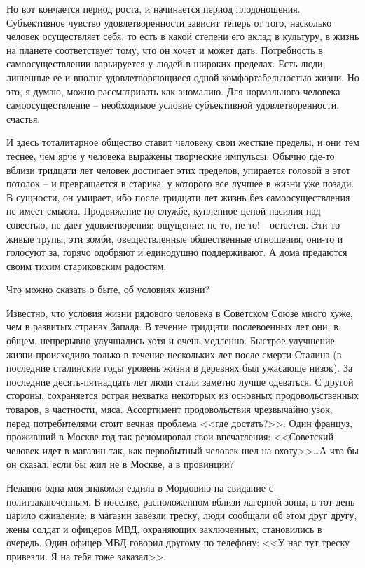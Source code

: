 \documentclass{book}
\begin{document}
Но вот кончается период роста, и начинается период плодо­ношения. Субъективное чувство удовлетворенности зависит теперь от того, 
насколько человек осуществляет себя,  то есть в какой степени его вклад в культуру, в жизнь на планете соответствует тому, что 
он хочет и может дать. Потребность в самоосуществлении варьируется у людей в широких пределах. Есть люди, лишенные ее и вполне 
удовлетворяющиеся одной комфортабельностью жизни. Но это, я думаю, можно рассматривать как аномалию. Для нормального человека 
самоосуществление -- необходимое условие субъективной удовлетворенности, счастья.

И здесь тоталитарное общество ставит человеку свои жесткие пределы, и они тем теснее, чем ярче у человека выражены творческие 
импульсы. Обычно где-то вблизи тридцати лет человек достигает этих пределов, упирается головой в этот потолок -- и превращается 
в старика, у которого все лучшее в жизни уже позади. В сущности, он умирает, ибо после тридцати лет жизнь без самоосуществления 
не имеет смысла. Продвиже­ние по службе, купленное ценой насилия над совестью, не дает удовлетворения; ощущение: не то, не то! - 
остается. Эти-то живые трупы, эти зомби, овеществленные общественные отно­шения, они-то и голосуют за, горячо одобряют и 
единодушно поддерживают. А дома предаются своим тихим стариковским радостям.

Что можно сказать о быте, об условиях жизни?

Известно, что условия жизни рядового человека в Советском Союзе много хуже, чем в развитых странах Запада. В течение тридцати 
послевоенных лет они, в общем, непрерывно улучшались хотя и очень медленно. Быстрое улучшение жизни происходило только в течение 
нескольких лет после смерти Сталина (в последние сталинские годы уровень жизни в дерев­нях был ужасающе низок). За последние 
десять-пятнадцать лет люди стали заметно лучше одеваться. С другой стороны, сохраняется острая нехватка некоторых из основных 
продовольственных товаров, в частности, мяса. Ассортимент продовольствия чрезвычайно узок, перед потребителями стоит вечная 
проблема <<где достать?>>. Один француз, проживший в Москве год так резюмировал свои впечатления: <<Советский человек идет в 
магазин так, как первобытный человек шел на охоту>>\ldots А что бы он сказал, если бы жил не в Москве, а в провинции?

Недавно одна моя знакомая ездила в Мордовию на свидание с политзаключенным. В поселке, расположенном вблизи лагерной зоны, в тот 
день царило оживление: в магазин завезли треску, люди сообщали об этом друг другу, жены солдат и офицеров МВД, охраняющих 
заключенных, становились в очередь. Один офицер МВД говорил другому по телефону: <<У нас тут треску привезли. Я на тебя тоже 
заказал>>.
\end{document}
